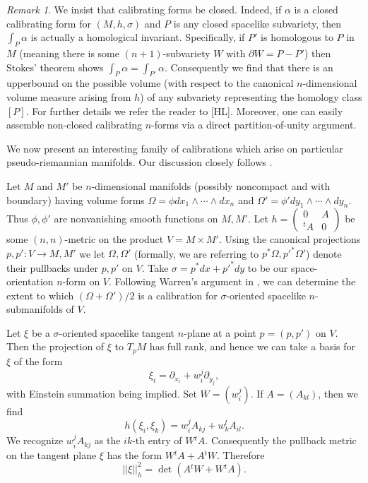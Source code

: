 \documentclass[12pt]{amsart}
\theoremstyle{definition}
\theoremstyle{remark}
\newtheorem{rem}[thm]{Remark}
\newcommand{\del}{\partial}
\begin{document}
\begin{rem} We insist that calibrating forms be closed. Indeed, if $\alpha$ is a closed calibrating form for $(M,h,\sigma)$ and $P$ is any closed spacelike subvariety, then $\int_P \alpha$ is actually a homological invariant. Specifically, if $P'$ is homologous to $P$ in $M$ (meaning there is some $(n+1)$-subvariety $W$ with $\del W = P-P'$) then Stokes' theorem shows $\int_P \alpha = \int_{P'} \alpha$. Consequently we find that there is an upperbound on the possible volume (with respect to the canonical $n$-dimensional volume measure arising from $h$) of any subvariety representing the homology class $[P]$. For further details we refer the reader to [HL]. Moreover, one can easily assemble non-closed calibrating $n$-forms via a direct partition-of-unity argument. 

\end{rem}

We now present an interesting family of calibrations which arise on particular pseudo-riemannian manifolds. Our discussion closely follows \cite{W}. 

Let $M$ and $M'$ be $n$-dimensional manifolds (possibly noncompact and with boundary) having volume forms $\Omega=\phi dx_1 \wedge \cdots \wedge dx_n$ and $\Omega'=\phi' dy_1 \wedge \cdots \wedge dy_n$. Thus $\phi, \phi'$ are nonvanishing smooth functions on $M,M'$. Let $h=\begin{pmatrix} 0&A \\ {}^tA & 0\end{pmatrix}$ be some $(n,n)$-metric on the product $V=M \times M'$. Using the canonical projections $p,p':V \to M, M'$ we let $\Omega, \Omega'$ (formally, we are referring to $p^*\Omega, p'^* \Omega'$) denote their pullbacks under $p,p'$ on $V$. Take $\sigma=p^*dx+p'^*dy$ to be our space-orientation $n$-form on $V$. Following Warren's argument in \cite{W}, we can determine the extent to which $(\Omega+\Omega')/2$ is a calibration for $\sigma$-oriented spacelike $n$-submanifolds of $V$.

Let $\xi$ be a $\sigma$-oriented spacelike tangent $n$-plane at a point $p=(p,p')$ on $V$. Then the projection of $\xi$ to $T_p M$ has full rank, and hence we can take a basis for $\xi$ of the form $$\xi_i = \del_{x_i}+w_i^j \del_{y_j},$$ with Einstein summation being implied. Set $W=(w_i^j)$. If $A=(A_{kl})$, then we find $$h(\xi_i, \xi_k)=w_i^j A_{kj}+w_k^l A_{il}.$$ We recognize $w_i^j A_{kj}$ as the $ik$-th entry of $W{}^tA$. Consequently the pullback metric on the tangent plane $\xi$ has the form $W {}^t A + A {}^t W$. Therefore $$||\xi||^2_h= \det(A {}^t W + W {}^tA).$$
\end{document}
